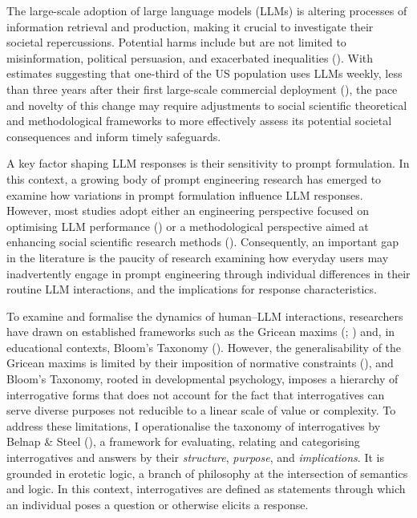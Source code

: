\documentclass[
  12pt,
]{article}
\begin{document}
The large-scale adoption of large language models (LLMs) is altering processes of information retrieval and production, making it crucial to investigate their societal repercussions. Potential harms include but are not limited to misinformation, political persuasion, and exacerbated inequalities (). With estimates suggesting that one-third of the US population uses LLMs weekly, less than three years after their first large-scale commercial deployment (), the pace and novelty of this change may require adjustments to social scientific theoretical and methodological frameworks to more effectively assess its potential societal consequences and inform timely safeguards.

A key factor shaping LLM responses is their sensitivity to prompt formulation. In this context, a growing body of prompt engineering research has emerged to examine how variations in prompt formulation influence LLM responses. However, most studies adopt either an engineering perspective focused on optimising LLM performance () or a methodological perspective aimed at enhancing social scientific research methods (). Consequently, an important gap in the literature is the paucity of research examining how everyday users may inadvertently engage in prompt engineering through individual differences in their routine LLM interactions, and the implications for response characteristics.

To examine and formalise the dynamics of human--LLM interactions, researchers have drawn on established frameworks such as the Gricean maxims (; ) and, in educational contexts, Bloom's Taxonomy (). However, the generalisability of the Gricean maxims is limited by their imposition of normative constraints (), and Bloom's Taxonomy, rooted in developmental psychology, imposes a hierarchy of interrogative forms that does not account for the fact that interrogatives can serve diverse purposes not reducible to a linear scale of value or complexity. To address these limitations, I operationalise the taxonomy of interrogatives by Belnap \& Steel (), a framework for evaluating, relating and categorising interrogatives and answers by their \emph{structure}, \emph{purpose}, and \emph{implications}. It is grounded in erotetic logic, a branch of philosophy at the intersection of semantics and logic. In this context, interrogatives are defined as statements through which an individual poses a question or otherwise elicits a response.
\end{document}
